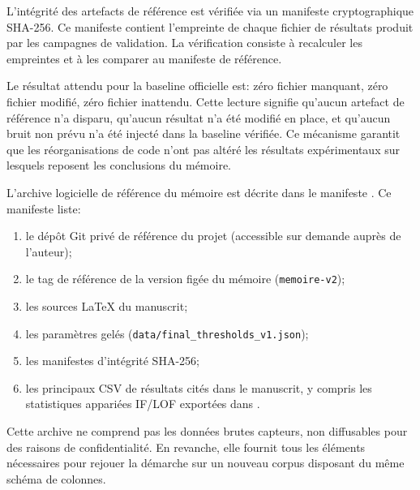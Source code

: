 L'intégrité des artefacts de référence est vérifiée via un manifeste cryptographique
SHA-256. Ce manifeste contient l'empreinte de chaque fichier de résultats produit par les
campagnes de validation. La vérification consiste à recalculer les empreintes et à les
comparer au manifeste de référence.

Le résultat attendu pour la baseline officielle est: zéro fichier manquant, zéro fichier
modifié, zéro fichier inattendu. Cette lecture signifie qu'aucun artefact de référence n'a
disparu, qu'aucun résultat n'a été modifié en place, et qu'aucun bruit non prévu n'a été
injecté dans la baseline vérifiée. Ce mécanisme garantit que les réorganisations de code
n'ont pas altéré les résultats expérimentaux sur lesquels reposent les conclusions du
mémoire.


L'archive logicielle de référence du mémoire est décrite dans le manifeste
. Ce manifeste liste:
\begin{enumerate}
    \item le dépôt Git privé de référence du projet (accessible sur demande
    auprès de l'auteur);
    \item le tag de référence de la version figée du mémoire (\texttt{memoire-v2});
    \item les sources LaTeX du manuscrit;
    \item les paramètres gelés (\texttt{data/final\_thresholds\_v1.json});
    \item les manifestes d'intégrité SHA-256;
    \item les principaux CSV de résultats cités dans le manuscrit, y compris les statistiques
    appariées IF/LOF exportées dans .
\end{enumerate}

Cette archive ne comprend pas les données brutes capteurs, non diffusables pour des raisons
de confidentialité. En revanche, elle fournit tous les éléments nécessaires pour rejouer
la démarche sur un nouveau corpus disposant du même schéma de colonnes.


